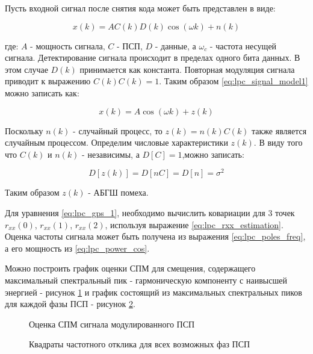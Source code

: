 Пусть входной сигнал после снятия кода может быть представлен в виде:
\begin{center}
\begin{equation}
	\label{eq:lpc_signal_model1}
	x(k) = AC(k)D(k)\cos(\omega k) + n(k)
\end{equation}
\end{center}
где: ${A}$ - мощность сигнала, ${C}$ - ПСП, ${D}$ - данные, а ${\omega_{c}}$ - частота несущей сигнала.
Детектирование сигнала происходит в пределах одного бита данных. В этом случае ${D(k)}$
принимается как константа. Повторная модуляция сигнала приводит к выражению ${C(k)C(k)=1}$.
Таким образом \ref{eq:lpc_signal_model1} можно записать как:
\begin{center}
\begin{equation}
	\label{eq:lpc_signal_model2}
	x(k)= A \cos{(\omega k)} + z(k)
\end{equation}
\end{center}

Поскольку ${n(k)}$ - случайный процесс, то ${z(k) = n(k)C(k)}$ также является
случайным процессом. Определим числовые характеристики ${z(k)}$.
В виду того что ${C(k)}$ и ${n(k)}$ - независимы, а ${D[C] = 1}$,можно записать:

\begin{center}
\begin{equation}
	D[z(k)] = D[nC] = D[n] = \sigma ^2
\end{equation}
\end{center}
Таким образом ${z(k)}$ - АБГШ помеха.

Для уравнения \ref{eq:lpc_gps_1}, необходимо вычислить ковариации для 3 точек
${r_{xx}(0)}$, ${r_{xx}(1)}$, ${r_{xx}(2)}$, используя выражение \ref{eq:lpc_rxx_estimation}.
Оценка частоты сигнала может быть получена из выражения \ref{eq:lpc_poles_freq}, а его
мощность из \ref{eq:lpc_power_cos}.

Можно построить график оценки СПМ для смещения,
содержащего максимальный спектральный пик - гармоническую компоненту
с наивысшей энергией - рисунок \ref{pic:lpc_psd_1} и график состоящий из максимальных спектральных пиков для каждой фазы
ПСП - рисунок \ref{pic:lpc_1sat_energy}.

\begin{figure}[H]
	\center{}
	\caption{Оценка СПМ сигнала модулированного ПСП}
	\label{pic:lpc_psd_1}
\end{figure}
\begin{figure}[H]
	\center{}
	\caption{Квадраты частотного отклика для всех возможных фаз ПСП}
	\label{pic:lpc_1sat_energy}
\end{figure}


